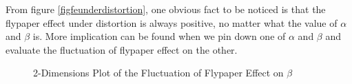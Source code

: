 From figure \ref*{figfeunderdistortion}, one obvious fact to be noticed is that the flypaper effect under distortion is always positive, no matter what the value of $\alpha$ and $\beta$ is. More implication can be found when we pin down one of $\alpha$ and $\beta$ and evaluate the fluctuation of flypaper effect on the other.

\begin{figure}[H]
    \centering
    \caption{2-Dimensions Plot of the Fluctuation of Flypaper Effect on $\beta$}
    \label{febeta}
\end{figure}

